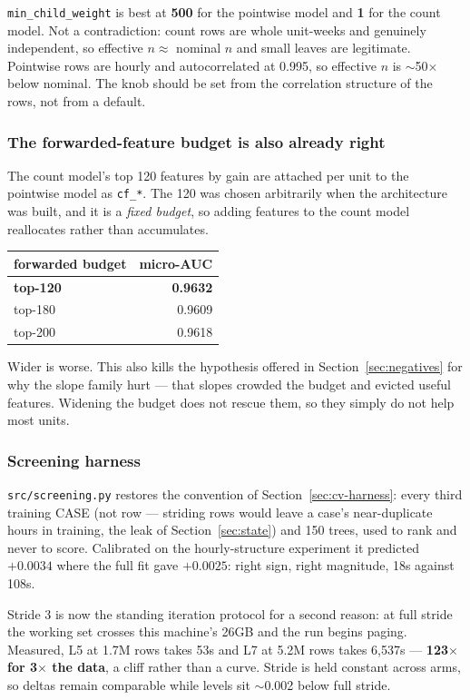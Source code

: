 \begin{finding}
\texttt{min\_child\_weight} is best at \textbf{500} for the pointwise model and \textbf{1} for
the count model. Not a contradiction: count rows are whole unit-weeks and genuinely independent,
so effective $n \approx$ nominal $n$ and small leaves are legitimate. Pointwise rows are hourly
and autocorrelated at 0.995, so effective $n$ is $\sim$50$\times$ below nominal. The knob should
be set from the correlation structure of the rows, not from a default.
\end{finding}

\subsubsection*{The forwarded-feature budget is also already right}

The count model's top 120 features by gain are attached per unit to the pointwise model as
\texttt{cf\_*}. The 120 was chosen arbitrarily when the architecture was built, and it is a
\emph{fixed budget}, so adding features to the count model reallocates rather than accumulates.

\begin{center}\small
\begin{tabular}{lr}
\toprule
forwarded budget & micro-AUC \\
\midrule
\textbf{top-120} & \textbf{0.9632} \\
top-180 & 0.9609 \\
top-200 & 0.9618 \\
\bottomrule
\end{tabular}
\end{center}

\begin{finding}
Wider is worse. This also kills the hypothesis offered in Section~\ref{sec:negatives} for why the
slope family hurt --- that slopes crowded the budget and evicted useful features. Widening the
budget does not rescue them, so they simply do not help most units.
\end{finding}

\subsubsection*{Screening harness}

\texttt{src/screening.py} restores the convention of Section~\ref{sec:cv-harness}: every third
training CASE (not row --- striding rows would leave a case's near-duplicate hours in training,
the leak of Section~\ref{sec:state}) and 150 trees, used to rank and never to score. Calibrated
on the hourly-structure experiment it predicted $+0.0034$ where the full fit gave $+0.0025$:
right sign, right magnitude, 18s against 108s.

Stride 3 is now the standing iteration protocol for a second reason: at full stride the working
set crosses this machine's 26GB and the run begins paging. Measured, L5 at 1.7M rows takes 53s
and L7 at 5.2M rows takes 6{,}537s --- \textbf{123$\times$ for 3$\times$ the data}, a cliff rather
than a curve. Stride is held constant across arms, so deltas remain comparable while levels sit
$\sim$0.002 below full stride.
